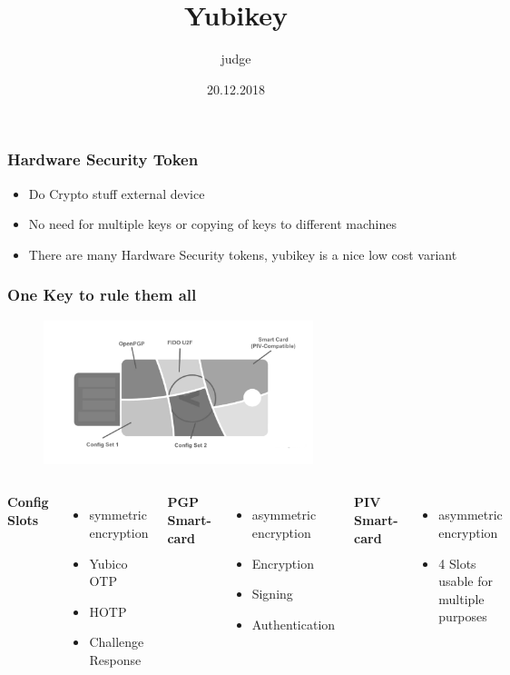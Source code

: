 \documentclass{beamer}
\title{Yubikey}
\author{judge}
\date{20.12.2018}
\begin{document}
 
\frame{\titlepage}


\begin{frame}
\frametitle{Hardware Security Token}
	\begin{itemize}
		\item{Do Crypto stuff external device}
		\item{No need for multiple keys or copying of keys to different machines}
		\item{There are many Hardware Security tokens, yubikey is a nice low cost variant}
	\end{itemize}
\end{frame}

\begin{frame}
\frametitle{One Key to rule them all}
	\begin{figure}[h]
		\center
		\includegraphics[width=0.7\textwidth]{images/functionality.png}
	\end{figure}
	\begin{columns}
			\textbf{Config Slots}
			\begin{itemize}
				\item{symmetric encryption}
				\item{Yubico OTP}
				\item{HOTP}
				\item{Challenge Response}
			\end{itemize}
			\textbf{PGP Smart-card}
			\begin{itemize}
				\item{asymmetric encryption}
				\item{Encryption}
				\item{Signing}
				\item{Authentication}
			\end{itemize}
			\textbf{PIV Smart-card}
			\begin{itemize}
				\item{asymmetric encryption}
				\item{4 Slots usable for multiple purposes}
			\end{itemize}
	\end{columns}
\end{frame}
\end{document}
